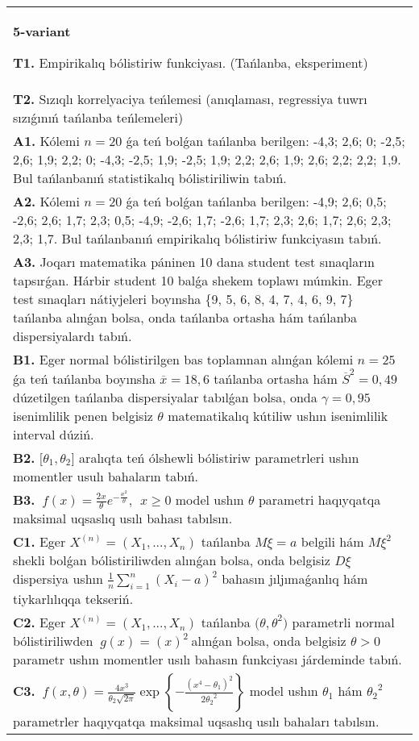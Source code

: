 \documentclass{article}
\begin{document}
\begin{tabular}{m{17cm}}
\textbf{5-variant}
\newline

\textbf{T1.} 
Empirikalıq bólistiriw funkciyası. (Tańlanba, eksperiment)
 \\
\textbf{T2.} 
Sızıqlı korrelyaciya teńlemesi (anıqlaması, regressiya tuwrı sızıǵınıń tańlanba teńlemeleri)
 \\
\textbf{A1.} 
Kólemi \(n = 20\) ǵa teń bolǵan tańlanba berilgen: -4,3; 2,6; 0; -2,5; 2,6; 1,9; 2,2; 0; -4,3; -2,5; 1,9; -2,5; 1,9; 2,2; 2,6; 1,9; 2,6; 2,2; 2,2; 1,9. Bul tańlanbanıń statistikalıq bólistiriliwin tabıń.
 \\
\textbf{A2.} 
Kólemi \(n = 20\) ǵa teń bolǵan tańlanba berilgen: -4,9; 2,6; 0,5; -2,6; 2,6; 1,7; 2,3; 0,5; -4,9; -2,6; 1,7; -2,6; 1,7; 2,3; 2,6; 1,7; 2,6; 2,3; 2,3; 1,7. Bul tańlanbanıń empirikalıq bólistiriw funkciyasın tabıń.
 \\
\textbf{A3.} 
Joqarı matematika páninen 10 dana student test sınaqların tapsırǵan. Hárbir student 10 balǵa shekem toplawı múmkin. Eger test sınaqları nátiyjeleri boyınsha \{9, 5, 6, 8, 4, 7, 4, 6, 9, 7\} tańlanba alınǵan bolsa, onda tańlanba ortasha hám tańlanba dispersiyalardı tabıń.
 \\
\textbf{B1.} 
Eger normal bólistirilgen bas toplamnan alınǵan kólemi \(n = 25\) ǵa teń tańlanba boyınsha \(\overline{x} = 18,6\) tańlanba ortasha hám \({\overline{S}}^{2} = 0,49\) dúzetilgen tańlanba dispersiyalar tabılǵan bolsa, onda \(\gamma = 0,95\) isenimlilik penen belgisiz \(\theta\) matematikalıq kútiliw ushın isenimlilik interval dúziń.
 \\
\textbf{B2.} 
\(\lbrack\theta_{1},\theta_{2}\rbrack\) aralıqta teń ólshewli bólistiriw parametrleri ushın momentler usulı bahaların tabıń.
 \\
\textbf{B3.} 
\(\ f(x) = \frac{2x}{\theta}e^{- \frac{x^{2}}{\theta}},\ \ x \geq 0\) model ushın \(\theta\) parametri haqıyqatqa maksimal uqsaslıq usılı bahası tabılsın.
 \\
\textbf{C1.} 
Eger \(X^{(n)} = \left( X_{1},...,X_{n} \right)\) tańlanba \(M\xi = a\) belgili hám \(M\xi^{2}\) shekli bolǵan bólistiriliwden alınǵan bolsa, onda belgisiz \(D\xi\) dispersiya ushın \(\frac{1}{n}\sum_{i = 1}^{n}\left( X_{i} - a \right)^{2}\) bahasın jıljımaǵanlıq hám tiykarlılıqqa tekseriń.
 \\
\textbf{C2.} 
Eger \(X^{(n)} = \left( X_{1},...,X_{n} \right)\) tańlanba \({(\theta,\theta}^{2})\) parametrli normal bólistiriliwden \({\ g(x) = (x)}^{2}\ \)alınǵan bolsa, onda belgisiz \(\theta > 0\) parametr ushın momentler usılı bahasın funkciyası járdeminde tabıń.
 \\
\textbf{C3.} 
\(\ f(x,\theta) = \frac{4x^{3}}{\theta_{2}\sqrt{2\pi}}\exp\left\{ - \frac{\left( x^{4} - \theta_{1} \right)^{2}}{2{\theta_{2}}^{2}} \right\}\) model ushın \(\theta_{1}\) hám \({\theta_{2}}^{2}\) parametrler haqıyqatqa maksimal uqsaslıq usılı bahaları tabılsın.
 \\

\end{tabular}
\vspace{1cm}
\end{document}
